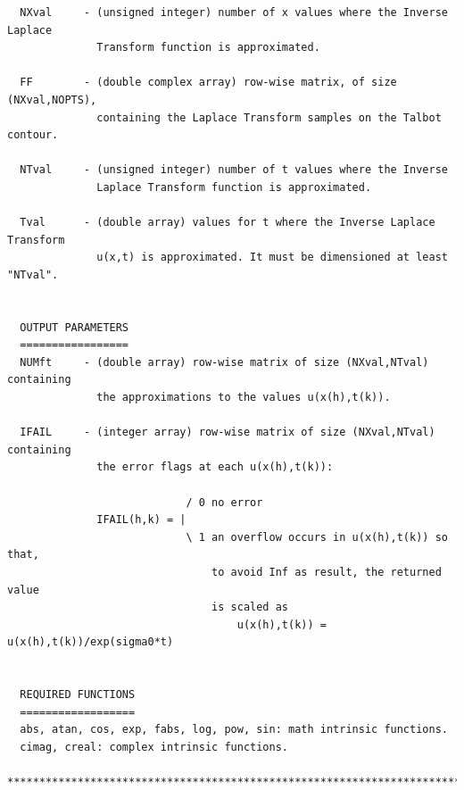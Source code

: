 \documentclass[a4paper,10pt]{report}%
\begin{document}
\begin{lstlisting}
  NXval     - (unsigned integer) number of x values where the Inverse Laplace
              Transform function is approximated.

  FF        - (double complex array) row-wise matrix, of size (NXval,NOPTS),
              containing the Laplace Transform samples on the Talbot contour.

  NTval     - (unsigned integer) number of t values where the Inverse
              Laplace Transform function is approximated.

  Tval      - (double array) values for t where the Inverse Laplace Transform
              u(x,t) is approximated. It must be dimensioned at least "NTval".


  OUTPUT PARAMETERS
  =================
  NUMft     - (double array) row-wise matrix of size (NXval,NTval) containing
              the approximations to the values u(x(h),t(k)).

  IFAIL     - (integer array) row-wise matrix of size (NXval,NTval) containing
              the error flags at each u(x(h),t(k)):

                            / 0 no error
              IFAIL(h,k) = |
                            \ 1 an overflow occurs in u(x(h),t(k)) so that,
                                to avoid Inf as result, the returned value
                                is scaled as
                                    u(x(h),t(k)) = u(x(h),t(k))/exp(sigma0*t)


  REQUIRED FUNCTIONS
  ==================
  abs, atan, cos, exp, fabs, log, pow, sin: math intrinsic functions.
  cimag, creal: complex intrinsic functions.

*****************************************************************************\
\end{lstlisting}
\end{document}
